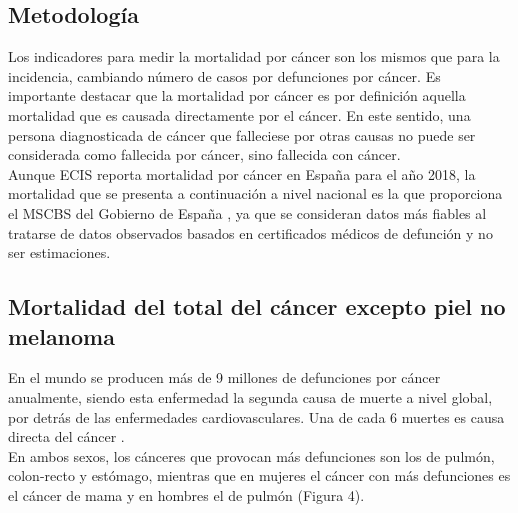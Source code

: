 \subsection{Metodología}

Los indicadores para medir la mortalidad por cáncer son los mismos que para la incidencia, cambiando número de casos por defunciones por cáncer. Es importante destacar que la mortalidad por cáncer es por definición aquella mortalidad que es causada directamente por el cáncer. En este sentido, una persona diagnosticada de cáncer que falleciese por otras causas no puede ser considerada como fallecida por cáncer, sino fallecida con cáncer.\\

Aunque ECIS \cite{ECIS} reporta mortalidad por cáncer en España para el año 2018, la mortalidad que se presenta a continuación a nivel nacional es la que proporciona el MSCBS del Gobierno de España \cite{MSCBS}, ya que se consideran datos más fiables al tratarse de datos observados basados en certificados médicos de defunción y no ser estimaciones.
 
\subsection{Mortalidad del total del cáncer excepto piel no melanoma}

En el mundo se producen más de 9 millones de defunciones por cáncer anualmente, siendo esta enfermedad la segunda causa de muerte a nivel global, por detrás de las enfermedades cardiovasculares. Una de cada 6 muertes es causa directa del cáncer \cite{WorldHealthOrganization2018}.\\

En ambos sexos, los cánceres que provocan más defunciones son los de pulmón, colon-recto y estómago, mientras que en mujeres el cáncer con más defunciones es el cáncer de mama y en hombres el de pulmón (Figura 4).\\

